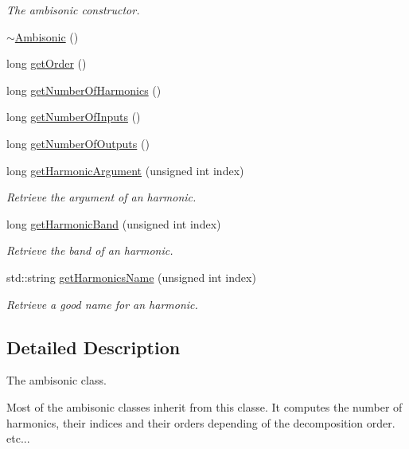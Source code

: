 \begin{DoxyCompactItemize}
\begin{DoxyCompactList}\small\item\em The ambisonic constructor. \end{DoxyCompactList}\item 
\hyperlink{class_hoa3_d_1_1_ambisonic_aef717915cc52d318b5b40af88c38c722}{$\sim$\-Ambisonic} ()
\item 
long \hyperlink{class_hoa3_d_1_1_ambisonic_abe3b53fb4a6e7b63eee582a026987458}{get\-Order} ()
\item 
long \hyperlink{class_hoa3_d_1_1_ambisonic_a0688ea4e2401eda492a813da8b800568}{get\-Number\-Of\-Harmonics} ()
\item 
long \hyperlink{class_hoa3_d_1_1_ambisonic_abe5de38dd1df17edf369732b46b8e1ad}{get\-Number\-Of\-Inputs} ()
\item 
long \hyperlink{class_hoa3_d_1_1_ambisonic_a7a13c6e5ac82f4279d78d4d9f2a31560}{get\-Number\-Of\-Outputs} ()
\item 
long \hyperlink{class_hoa3_d_1_1_ambisonic_a01a38c7f5f505d7fd5e6ef4af513628a}{get\-Harmonic\-Argument} (unsigned int index)
\begin{DoxyCompactList}\small\item\em Retrieve the argument of an harmonic. \end{DoxyCompactList}\item 
long \hyperlink{class_hoa3_d_1_1_ambisonic_ac5dd2285bbfdfdfe45b11d39379a0974}{get\-Harmonic\-Band} (unsigned int index)
\begin{DoxyCompactList}\small\item\em Retrieve the band of an harmonic. \end{DoxyCompactList}\item 
std\-::string \hyperlink{class_hoa3_d_1_1_ambisonic_a33ce838226f9c12ffc49ed5d78a244b1}{get\-Harmonics\-Name} (unsigned int index)
\begin{DoxyCompactList}\small\item\em Retrieve a good name for an harmonic. \end{DoxyCompactList}\end{DoxyCompactItemize}


\subsection{Detailed Description}
The ambisonic class. 

Most of the ambisonic classes inherit from this classe. It computes the number of harmonics, their indices and their orders depending of the decomposition order. etc... 

